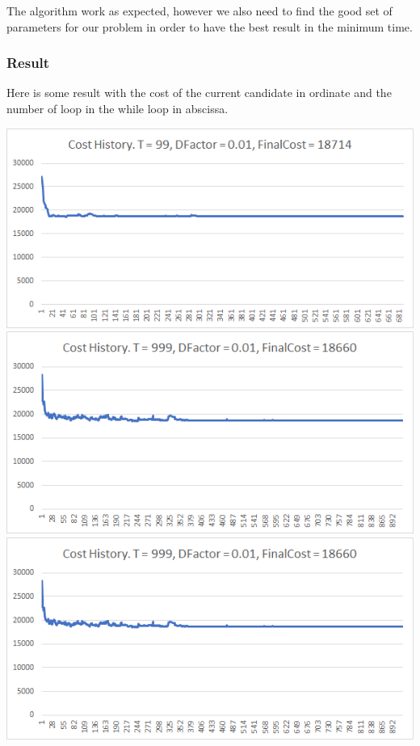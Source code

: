 \documentclass[11pt]{article}
\begin{document}
The algorithm work as expected, however we also need to find the good
set of parameters for our problem in order to have the best result in
the minimum time.

\hypertarget{result}{%
\subsubsection{Result}\label{result}}

Here is some result with the cost of the current candidate in ordinate
and the number of loop in the while loop in abscissa.

\begin{center}
\includegraphics{sa_99_01}
\includegraphics{sa_999_01}
\includegraphics{sa_999_01}
\end{center}
\end{document}
